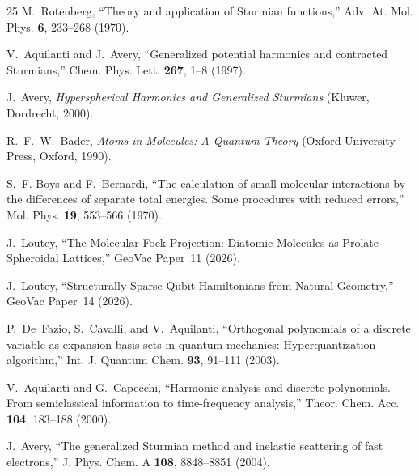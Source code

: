 \documentclass[aps,pra,twocolumn,superscriptaddress,longbibliography]{revtex4-2}
\begin{document}
\begin{thebibliography}{25}
M.~Rotenberg,
``Theory and application of Sturmian functions,''
Adv. At. Mol. Phys. \textbf{6}, 233--268 (1970).

V.~Aquilanti and J.~Avery,
``Generalized potential harmonics and contracted Sturmians,''
Chem. Phys. Lett. \textbf{267}, 1--8 (1997).

J.~Avery,
\textit{Hyperspherical Harmonics and Generalized Sturmians}
(Kluwer, Dordrecht, 2000).

R.~F.~W.~Bader,
\textit{Atoms in Molecules: A Quantum Theory}
(Oxford University Press, Oxford, 1990).

S.~F. Boys and F.~Bernardi,
``The calculation of small molecular interactions by the differences
of separate total energies. Some procedures with reduced errors,''
Mol. Phys. \textbf{19}, 553--566 (1970).

J.~Loutey,
``The Molecular Fock Projection: Diatomic Molecules as Prolate
Spheroidal Lattices,''
GeoVac Paper~11 (2026).

J.~Loutey,
``Structurally Sparse Qubit Hamiltonians from Natural Geometry,''
GeoVac Paper~14 (2026).

P.~De~Fazio, S.~Cavalli, and V.~Aquilanti,
``Orthogonal polynomials of a discrete variable as expansion basis
sets in quantum mechanics: Hyperquantization algorithm,''
Int. J. Quantum Chem. \textbf{93}, 91--111 (2003).

V.~Aquilanti and G.~Capecchi,
``Harmonic analysis and discrete polynomials. From semiclassical
information to time-frequency analysis,''
Theor. Chem. Acc. \textbf{104}, 183--188 (2000).

J.~Avery,
``The generalized Sturmian method and inelastic scattering of fast
electrons,''
J. Phys. Chem. A \textbf{108}, 8848--8851 (2004).

\end{thebibliography}
\end{document}
